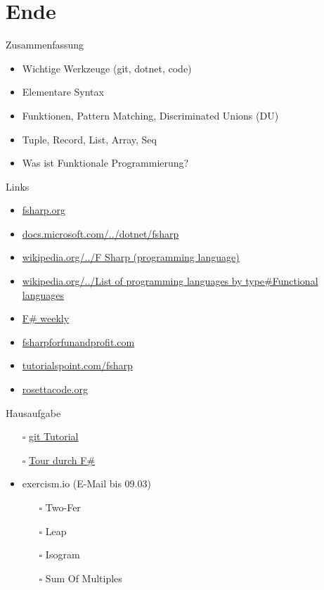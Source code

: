 \documentclass[t]{beamer}
\begin{document}
\section{Ende }
\label{sec:org5ea3892}

\begin{frame}[label={sec:org9321c92}]{Zusammenfassung}
\begin{itemize}
\item Wichtige Werkzeuge (git, dotnet, code)
\item Elementare Syntax
\item Funktionen, Pattern Matching, Discriminated Unions (DU)
\item Tuple, Record, List, Array, Seq
\item Was ist Funktionale Programmierung?
\end{itemize}
\end{frame}

\begin{frame}[label={sec:orgc5743c0}]{Links}
\begin{itemize}
\item \href{https://fsharp.org/}{fsharp.org}
\item \href{https://docs.microsoft.com/de-de/dotnet/fsharp/}{docs.microsoft.com/../dotnet/fsharp}
\item \href{https://en.wikipedia.org/wiki/F\_Sharp\_(programming\_language)}{wikipedia.org/../F Sharp (programming language)}
\item \href{https://en.wikipedia.org/wiki/List\_of\_programming\_languages\_by\_type\#Functional\_languages}{wikipedia.org/../List of programming languages by type\#Functional languages}
\item \href{https://sergeytihon.com/}{F\# weekly}
\item \href{https://fsharpforfunandprofit.com/}{fsharpforfunandprofit.com}
\item \href{https://www.tutorialspoint.com/fsharp/index.htm}{tutorialspoint.com/fsharp}
\item \href{http://www.rosettacode.org/}{rosettacode.org}
\end{itemize}
\end{frame}

\begin{frame}[label={sec:orgaa3d2cc}]{Hausaufgabe}
\begin{itemize}
\item[{$\square$}] \href{https://git-scm.com/docs/gittutorial}{git Tutorial}
\item[{$\square$}] \href{https://docs.microsoft.com/de-de/dotnet/fsharp/tour}{Tour durch F\#}
\item exercism.io (E-Mail bis 09.03)
\begin{itemize}
\item[{$\square$}] Two-Fer
\item[{$\square$}] Leap
\item[{$\square$}] Isogram
\item[{$\square$}] Sum Of Multiples
\end{itemize}
\end{itemize}
\end{frame}
\end{document}
